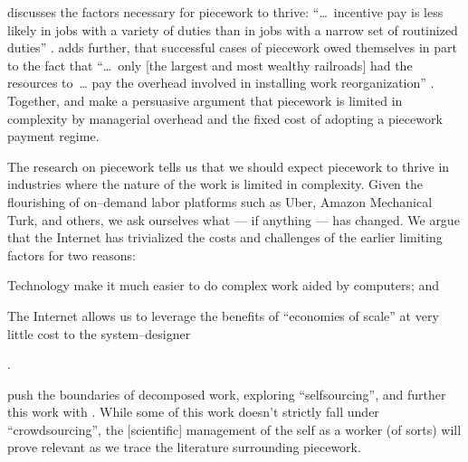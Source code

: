 \documentclass[trackingWork]{subfiles}
\begin{document}
\citeauthor{Brown01041990} discusses the factors necessary for piecework to thrive:
    ``\dots~incentive pay is less likely in jobs with
    a variety of duties than in jobs with a narrow set of routinized duties''
\cite{Brown01041990}.
\citeauthor{10.2307/23702539} adds further, that
successful cases of piecework owed themselves in part to the fact that
    ``\dots~only [the largest and most wealthy railroads] had the resources to~\dots
    pay the overhead involved in installing work reorganization''
\cite{10.2307/23702539}.
Together, \citeauthor{10.2307/23702539} and \citeauthor{Brown01041990}
make a persuasive argument that piecework is limited in complexity by
managerial overhead and the fixed cost of adopting a piecework payment regime.


The research on piecework tells us that
we should expect piecework to thrive in industries where
the nature of the work is limited in complexity.
Given the flourishing of on--demand labor platforms such as
Uber, Amazon Mechanical Turk, and others, we ask ourselves
what --- if anything --- has changed.
We argue that the Internet has trivialized the costs and challenges of the earlier limiting factors for two reasons:
\begin{inlinelist}
  \item Technology make it much easier to do complex work aided by computers; and %
  \item The Internet allows us to leverage the benefits of ``economies of scale'' at very little cost
        to the system--designer \cite{lessig2006code}
\end{inlinelist}.


\citeauthor{selfsourcingTeevan2014} push the boundaries of decomposed work,
exploring ``selfsourcing'', and further this work with \citeauthor{selfsourcingTeevan2016}
\cite{selfsourcingTeevan2014,selfsourcingTeevan2016}.
While some of this work doesn't strictly fall under ``crowdsourcing'',
the [scientific] management of the self as a worker
(of sorts)
will prove relevant as we trace the literature surrounding piecework.
\end{document}
